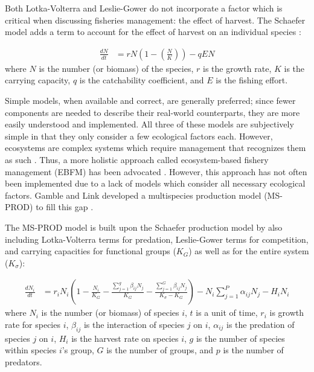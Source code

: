 Both Lotka-Volterra and Leslie-Gower do not incorporate a factor which is critical when discussing fisheries management: the effect of harvest.  The Schaefer model adds a term to account for the effect of harvest on an individual species \cite{schaefer1957}:

\begin{align}
   \frac{d N}{dt} &= r N \left(1 - \left(\frac{N}{K}\right)\right) - q E N
\end{align}
where $N$ is the number (or biomass) of the species, $r$ is the growth rate, $K$ is the carrying capacity, $q$ is the catchability coefficient, and $E$ is the fishing effort.

Simple models, when available and correct, are generally preferred; since fewer components are needed to describe their real-world counterparts, they are more easily understood and implemented.  All three of these models are subjectively simple in that they only consider a few ecological factors each. However, ecosystems are complex systems which require management that recognizes them as such \cite{christensen1996}.  Thus, a more holistic approach called ecosystem-based fishery management (EBFM) has been advocated \cite{united1999}.  However, this approach has not often been implemented due to a lack of models which consider all necessary ecological factors.  Gamble and Link developed a multispecies production model (MS-PROD) to fill this gap \cite{gamble2009}.

The MS-PROD model is built upon the Schaefer production model by also including Lotka-Volterra terms for predation, Leslie-Gower terms for competition, and carrying capacities for functional groups ($K_G$) as well as for the entire system ($K_{\sigma}$):

\begin{align}
\frac{d N_i}{dt} &= r_i N_i \left(1 - \frac{N_i}{K_G} - \frac{\displaystyle\sum\limits_{j=1}^g \beta_{ij} N_j}{K_G} - \frac{\displaystyle\sum\limits_{j=1}^G \beta_{ij} N_j}{K_{\sigma} - K_G}\right) - N_i \displaystyle\sum\limits_{j=1}^P \alpha_{ij} N_j - H_i N_i
\end{align}
where $N_i$ is the number (or biomass) of species $i$, $t$ is a unit of time, $r_i$ is growth rate for species $i$, $\beta_{ij}$ is the interaction of species $j$ on $i$, $\alpha_{ij}$ is the predation of species $j$ on $i$, $H_i$ is the harvest rate on species $i$, $g$ is the number of species within species $i$'s group, $G$ is the number of groups, and $p$ is the number of predators.

